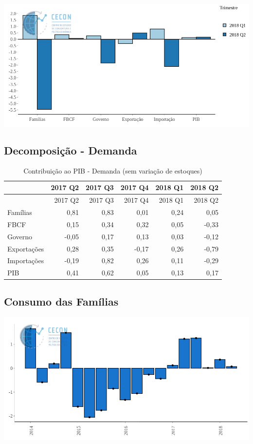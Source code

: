 \documentclass[11pt,portuguese,]{article}
\begin{document}
\begin{center}\includegraphics[width=1\linewidth]{Grafico_Demanda} \end{center}

\subsection{Decomposição - Demanda}\label{decomposicao---demanda}

\begin{longtable}[]{@{}lrrrrr@{}}
\caption{Contribuição ao PIB - Demanda (sem variação de
estoques)}\tabularnewline
\toprule
& 2017 Q2 & 2017 Q3 & 2017 Q4 & 2018 Q1 & 2018 Q2\tabularnewline
\midrule
\endfirsthead
\toprule
& 2017 Q2 & 2017 Q3 & 2017 Q4 & 2018 Q1 & 2018 Q2\tabularnewline
\midrule
\endhead
Famílias & 0,81 & 0,83 & 0,01 & 0,24 & 0,05\tabularnewline
FBCF & 0,15 & 0,34 & 0,32 & 0,05 & -0,33\tabularnewline
Governo & -0,05 & 0,17 & 0,13 & 0,03 & -0,12\tabularnewline
Exportações & 0,28 & 0,35 & -0,17 & 0,26 & -0,79\tabularnewline
Importações & -0,19 & 0,82 & 0,26 & 0,11 & -0,29\tabularnewline
PIB & 0,41 & 0,62 & 0,05 & 0,13 & 0,17\tabularnewline
\bottomrule
\end{longtable}

\subsection{Consumo das Famílias}\label{consumo-das-familias}

\begin{center}\includegraphics[width=1\linewidth]{Grafico_CFam} \end{center}
\end{document}
